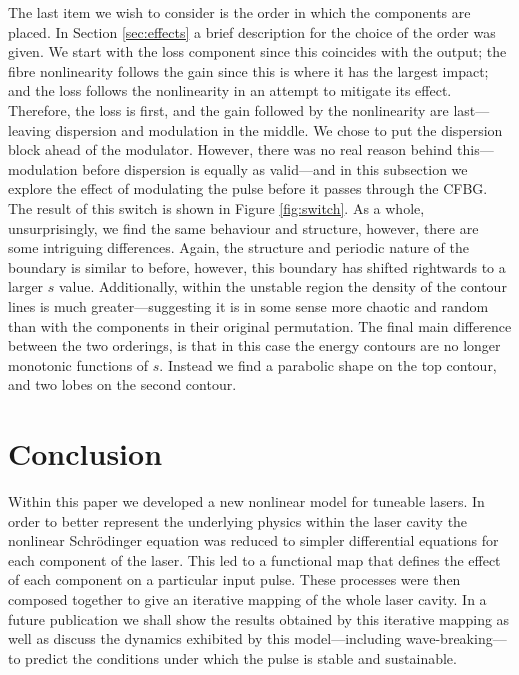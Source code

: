 \documentclass[10pt,twocolumn,a4paper]{article}
\begin{document}
The last item we wish to consider is the order in which the components are placed. In Section \ref{sec:effects} a brief description for the choice of the order was given. We start with the loss component since this coincides with the output; the fibre nonlinearity follows the gain since this is where it has the largest impact; and the loss follows the nonlinearity in an attempt to mitigate its effect. Therefore, the loss is first, and the gain followed by the nonlinearity are last---leaving dispersion and modulation in the middle. We chose to put the dispersion block ahead of the modulator. However, there was no real reason behind this---modulation before dispersion is equally as valid---and in this subsection we explore the effect of modulating the pulse before it passes through the CFBG. \\

The result of this switch is shown in Figure \ref{fig:switch}. As a whole, unsurprisingly, we find the same behaviour and structure, however, there are some intriguing differences. Again, the structure and periodic nature of the boundary is similar to before, however, this boundary has shifted rightwards to a larger $s$ value. Additionally, within the unstable region the density of the contour lines is much greater---suggesting it is in some sense more chaotic and random than with the components in their original permutation. The final main difference between the two orderings, is that in this case the energy contours are no longer monotonic functions of $s$. Instead we find a parabolic shape on the top contour, and two lobes on the second contour. \\






\section{Conclusion}
Within this paper we developed a new nonlinear model for tuneable lasers. In order to better represent the underlying physics within the laser cavity the nonlinear Schr\"{o}dinger equation was reduced to simpler differential equations for each component of the laser. This led to a functional map that defines the effect of each component on a particular input pulse. These processes were then composed together to give an iterative mapping of the whole laser cavity. In a future publication we shall show the results obtained by this iterative mapping as well as discuss the dynamics exhibited by this model---including wave-breaking---to predict the conditions under which the pulse is stable and sustainable.



\end{document}
